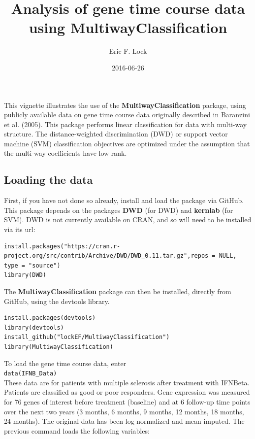 \documentclass[]{article}
\title{Analysis of gene time course data using MultiwayClassification}
\author{Eric F. Lock}
\date{2016-06-26}
\begin{document}
\maketitle


This vignette illustrates the use of the \textbf{MultiwayClassification}
package, using publicly available data on gene time course data
originally described in Baranzini et al. (2005). This package performs
linear classification for data with multi-way structure. The
distance-weighted discrimination (DWD) or support vector machine (SVM)
classification objectives are optimized under the assumption that the
multi-way coefficients have low rank.

\subsection{Loading the data}\label{loading-the-data}

First, if you have not done so already, install and load the package via
GitHub. This package depends on the packages \textbf{DWD} (for DWD) and
\textbf{kernlab} (for SVM). DWD is not currently available on CRAN, and
so will need to be installed via its url:

\begin{verbatim}
install.packages("https://cran.r-project.org/src/contrib/Archive/DWD/DWD_0.11.tar.gz",repos = NULL, type = "source")
library(DWD)
\end{verbatim}

The \textbf{MultiwayClassification} package can then be installed,
directly from GitHub, using the devtools library.

\begin{verbatim}
install.packages(devtools)
library(devtools)
install_github("lockEF/MultiwayClassification")
library(MultiwayClassification)
\end{verbatim}

To load the gene time course data,
enter\\\texttt{data(IFNB\_Data)}\\These data are for patients with
multiple sclerosis after treatment with IFNBeta. Patients are classified
as good or poor responders. Gene expression was measured for 76 genes of
interest before treatment (baseline) and at 6 follow-up time points over
the next two years (3 months, 6 months, 9 months, 12 months, 18 months,
24 months). The original data has been log-normalized and mean-imputed.
The previous command loads the following variables:
\end{document}

